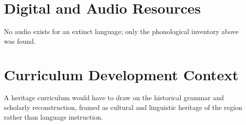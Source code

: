 \documentclass[12pt]{article}
\begin{document}
\section{Digital and Audio Resources}
No audio exists for an extinct language; only the phonological inventory above was found.

\section{Curriculum Development Context}
A heritage curriculum would have to draw on the historical grammar and scholarly reconstruction, framed as cultural and linguistic heritage of the region rather than language instruction.
\end{document}
